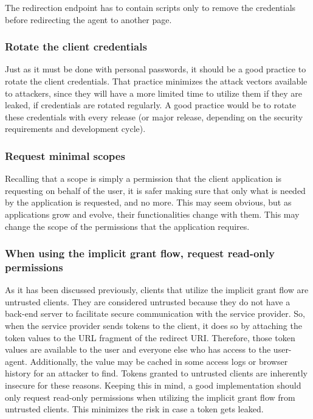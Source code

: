 The redirection endpoint has to contain scripts only to remove the credentials before redirecting the agent to another page.

\subsubsection{Rotate the client credentials}
Just as it must be done with personal passwords, it should be a good practice to rotate the client credentials. That practice minimizes the attack vectors available to attackers, since they will have a more limited time to utilize them if they are leaked, if credentials are rotated regularly.
A good practice would be to rotate these credentials with every release (or major release, depending on the security requirements and development cycle).

\subsubsection{Request minimal scopes}
Recalling that a scope is simply a permission that the client application is requesting on behalf of the user, it is safer making sure that only what is needed by the application is requested, and no more. This may seem obvious, but as applications grow and evolve, their functionalities change with them. This may change the scope of the permissions that the application requires.

\subsubsection{When using the implicit grant flow, request read-only permissions}
As it has been discussed previously, clients that utilize the implicit grant flow are untrusted clients.
They are considered untrusted because they do not have a back-end server to facilitate secure communication with the service provider. So, when the service provider sends tokens to the client, it does so by attaching the token values to the URL fragment of the redirect URI. Therefore, those token values are available to the user and everyone else who has access to the user-agent. Additionally, the value may be cached in some access logs or browser history for an attacker to find.
Tokens granted to untrusted clients are inherently insecure for these reasons. Keeping this in mind, a good implementation should only request read-only permissions when utilizing the implicit grant flow from untrusted clients. This minimizes the risk in case a token gets leaked.


